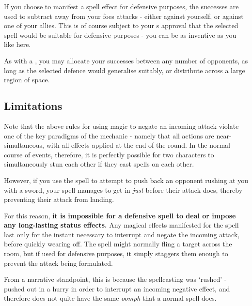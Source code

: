 If you choose to manifest a spell effect for defensive purposes, the successes are used to subtract away from your foes attacks - either against yourself, or against one of your allies. This is of course subject to your s approval that the selected spell would be suitable for defensive purposes - you can be as inventive as you like here. 

As with a , you may allocate your successes between any number of opponents, as long as the selected defence would generalise suitably, or distribute across a large region of space.

\subsection{Limitations} \label{S:CycleLimitations}

Note that the above rules for using magic to negate an incoming attack violate one of the key paradigms of the  mechanic - namely that all actions are near-simultaneous, with all effects applied at the end of the round. In the normal course of events, therefore, it is perfectly possible for two characters to simultaneously stun each other if they cast spells on each other. 

However, if you use the  spell to attempt to push back an opponent rushing at you with a sword, your spell manages to get in {\it just} before their attack does, thereby preventing their attack from landing. 

For this reason, {\bf it is impossible for a defensive spell to deal  or impose any long-lasting status effects.} Any magical effects manifested for the spell last only for the instant necessary to interrupt and negate the incoming attack, before quickly wearing off. The  spell might normally fling a target across the room, but if used for defensive purposes, it simply staggers them enough to prevent the attack being formulated. 

From a narrative standpoint, this is because the spellcasting was `rushed' - pushed out in a hurry in order to interrupt an incoming negative effect, and therefore does not quite have the same {\it oomph} that a normal spell does. 
